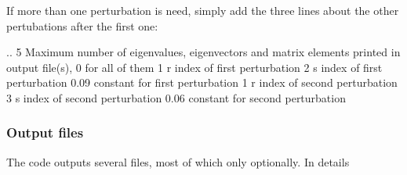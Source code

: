 If more than one perturbation is need, simply add the three lines about the other pertubations after the first one\+: \begin{DoxyVerb}..
5   Maximum number of eigenvalues, eigenvectors and matrix elements printed in output file(s), 0 for all of them
1    r index of first perturbation
2    s index of first perturbation
0.09  constant for first perturbation
1    r index of second perturbation
3    s index of second perturbation
0.06  constant for second perturbation
\end{DoxyVerb}


\subsubsection*{Output files}

The code outputs several files, most of which only optionally. In details


